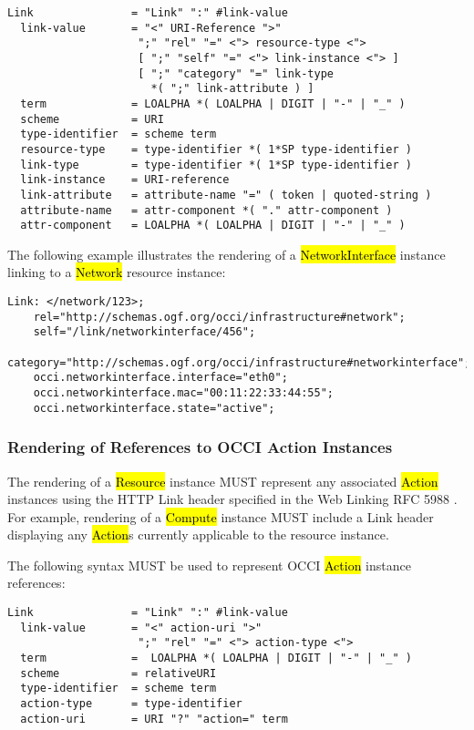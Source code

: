 \documentclass[10pt,a4paper]{article}
\begin{document}
\begin{verbatim}
Link               = "Link" ":" #link-value
  link-value       = "<" URI-Reference ">"
                    ";" "rel" "=" <"> resource-type <">
                    [ ";" "self" "=" <"> link-instance <"> ]
                    [ ";" "category" "=" link-type
                      *( ";" link-attribute ) ]
  term             = LOALPHA *( LOALPHA | DIGIT | "-" | "_" )
  scheme           = URI
  type-identifier  = scheme term
  resource-type    = type-identifier *( 1*SP type-identifier )
  link-type        = type-identifier *( 1*SP type-identifier )
  link-instance    = URI-reference
  link-attribute   = attribute-name "=" ( token | quoted-string )
  attribute-name   = attr-component *( "." attr-component )
  attr-component   = LOALPHA *( LOALPHA | DIGIT | "-" | "_" )
\end{verbatim}

The following example illustrates the rendering of a
\hl{NetworkInterface} \cite{occi:infrastructure} instance linking to a
\hl{Network} resource instance:

\begin{verbatim}
Link: </network/123>;
    rel="http://schemas.ogf.org/occi/infrastructure#network";
    self="/link/networkinterface/456";
    category="http://schemas.ogf.org/occi/infrastructure#networkinterface";
    occi.networkinterface.interface="eth0";
    occi.networkinterface.mac="00:11:22:33:44:55";
    occi.networkinterface.state="active";
\end{verbatim}

\subsubsection{Rendering of References to OCCI Action Instances}
The rendering of a \hl{Resource} instance \cite{occi:core} MUST
represent any associated \hl{Action} instances using the HTTP Link
header specified in the Web Linking RFC 5988 \cite{rfc5988}.  For
example, rendering of a \hl{Compute} instance MUST include a Link
header displaying any \hl{Action}s currently applicable to the
resource instance.

The following syntax MUST be used to represent OCCI \hl{Action}
instance references:

\begin{verbatim}
Link               = "Link" ":" #link-value
  link-value       = "<" action-uri ">"
                    ";" "rel" "=" <"> action-type <">
  term             =  LOALPHA *( LOALPHA | DIGIT | "-" | "_" )
  scheme           = relativeURI
  type-identifier  = scheme term
  action-type      = type-identifier
  action-uri       = URI "?" "action=" term
\end{verbatim}
\end{document}

